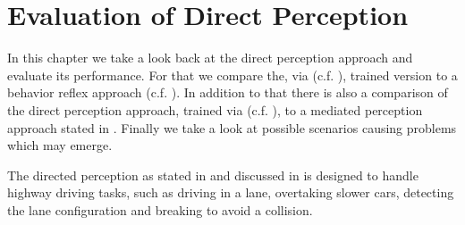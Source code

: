 \chapter{Evaluation of Direct Perception}

In this chapter we take a look back at the direct perception approach and evaluate its performance. For that we compare the, via \torcs (c.f. ), trained version to a behavior reflex approach (c.f. ). In addition to that there is also a comparison of the direct perception approach, trained via \kitti (c.f. ), to a mediated perception approach stated in \cite{geiger20143d}. \cite{DeepDriving}
Finally we take a look at possible scenarios causing problems which may emerge. 

The directed perception as stated in \cite{chen2015deepdriving} and discussed in  is designed to handle highway driving tasks, such as driving in a lane, overtaking slower cars, detecting the lane configuration and breaking to avoid a collision.


